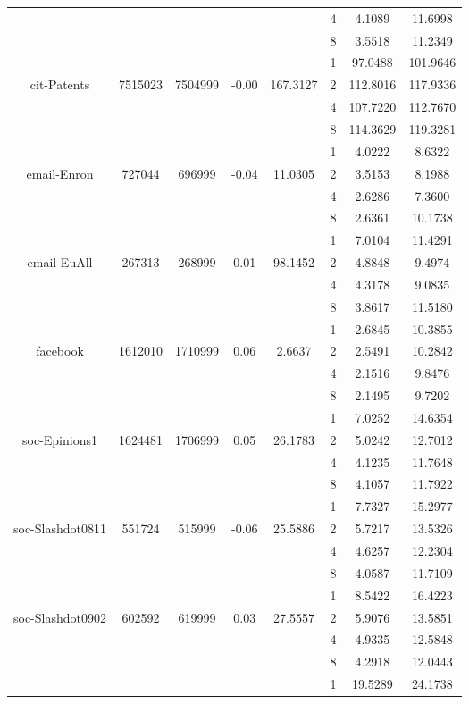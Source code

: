 \documentclass[11pt]{report}
\begin{document}
\begin{table}[t]
{\begin{tabular}{@{}c|c|c|c|c|c|c|c}
& & & & & 4 & 4.1089 & 11.6998 \\
& & & & & 8 & 3.5518 & 11.2349 \\
\hline
& & & & & 1 & 97.0488 & 101.9646 \\
cit-Patents & 7515023 & 7504999 & -0.00 & 167.3127 & 2 & 112.8016 & 117.9336 \\
& & & & & 4 & 107.7220 & 112.7670 \\
& & & & & 8 & 114.3629 & 119.3281 \\
\hline
& & & & & 1 & 4.0222 & 8.6322 \\
email-Enron & 727044 & 696999 & -0.04 & 11.0305 & 2 & 3.5153 & 8.1988 \\
& & & & & 4 & 2.6286 & 7.3600 \\
& & & & & 8 & 2.6361 & 10.1738 \\
\hline
& & & & & 1 & 7.0104 & 11.4291 \\
email-EuAll & 267313 & 268999 & 0.01 & 98.1452 & 2 & 4.8848 & 9.4974 \\
& & & & & 4 & 4.3178 & 9.0835 \\
& & & & & 8 & 3.8617 & 11.5180 \\
\hline
& & & & & 1 & 2.6845 & 10.3855 \\
facebook & 1612010 & 1710999 & 0.06 & 2.6637 & 2 & 2.5491 & 10.2842 \\
& & & & & 4 & 2.1516 & 9.8476 \\
& & & & & 8 & 2.1495 & 9.7202 \\
\hline
& & & & & 1 & 7.0252 & 14.6354 \\
soc-Epinions1 & 1624481 & 1706999 & 0.05 & 26.1783 & 2 & 5.0242 & 12.7012 \\
& & & & & 4 & 4.1235 & 11.7648 \\
& & & & & 8 & 4.1057 & 11.7922 \\
\hline
& & & & & 1 & 7.7327 & 15.2977 \\
soc-Slashdot0811 & 551724 & 515999 & -0.06 & 25.5886 & 2 & 5.7217 & 13.5326 \\
& & & & & 4 & 4.6257 & 12.2304 \\
& & & & & 8 & 4.0587 & 11.7109 \\
\hline
& & & & & 1 & 8.5422 & 16.4223 \\
soc-Slashdot0902 & 602592 & 619999 & 0.03 & 27.5557 & 2 & 5.9076 & 13.5851 \\
& & & & & 4 & 4.9335 & 12.5848 \\
& & & & & 8 & 4.2918 & 12.0443 \\
\hline
& & & & & 1 & 19.5289 & 24.1738 \\

\end{tabular}}
\end{table}
\end{document}
